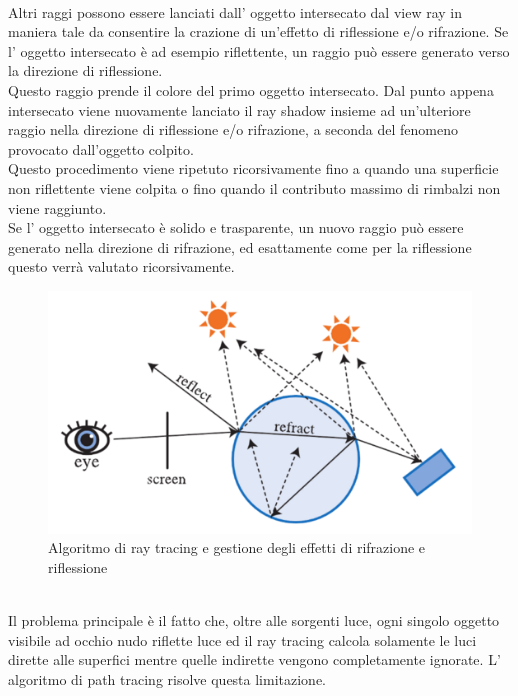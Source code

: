 \\
Altri raggi possono essere lanciati dall’ oggetto intersecato dal view ray in maniera tale da consentire la crazione di un’effetto di riflessione e/o rifrazione.
Se l’ oggetto intersecato è ad esempio riflettente, un raggio può essere generato verso la direzione di riflessione.
\\
Questo raggio prende il colore del primo oggetto intersecato. Dal punto appena intersecato viene nuovamente lanciato il ray shadow insieme ad un’ulteriore raggio nella direzione di riflessione e/o rifrazione, a seconda del fenomeno provocato dall’oggetto colpito. 
\\Questo procedimento viene ripetuto ricorsivamente fino a quando una superficie non riflettente viene colpita o fino quando il contributo massimo di rimbalzi non viene raggiunto.
\\
Se l’ oggetto intersecato è solido e trasparente, un nuovo raggio può essere generato nella direzione di rifrazione, ed esattamente come per la riflessione questo verrà valutato ricorsivamente.
\\
\begin{figure}[htb]
 \centering
 \includegraphics[width=0.7\linewidth]{images/chapter_stato_arte/stato_arte_refr_refl.png}\hfill
 \caption[Ray tracing ed effetti di rifrazione/riflessione]{Algoritmo di ray tracing e gestione degli effetti di rifrazione e riflessione}
 \label{fig:stato_arte_refr_refl}
\end{figure}
\\
Il problema principale è il fatto che, oltre alle sorgenti luce, ogni singolo oggetto visibile ad occhio nudo riflette luce ed il 
ray tracing calcola solamente le luci dirette alle superfici mentre quelle indirette vengono completamente ignorate. L’ algoritmo di path tracing risolve questa limitazione. \cite{path_ray}